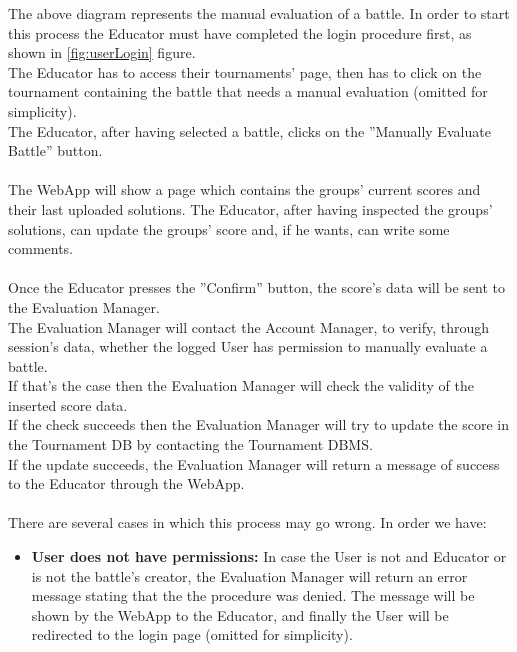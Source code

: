 \documentclass{article}
\begin{document}
{        \newpage
        The above diagram represents the manual evaluation of a battle.
        In order to start this process the Educator must have completed the login procedure first, as shown in \ref{fig:userLogin}
        figure.\\ 
        The Educator has to access their tournaments' page, then has to click on the tournament containing the 
        battle that needs a manual evaluation (omitted for simplicity).\\
        The Educator, after having selected a battle, clicks on the ”Manually Evaluate Battle” button.\\
        \\
        The WebApp will show a page which contains the groups' current scores and their last uploaded solutions.
        The Educator, after having inspected the groups' solutions, can update the groups' score and, if he wants, can write some comments.
        \\ \\
        Once the Educator presses the ”Confirm” button, the score's data will be sent to the Evaluation Manager.\\
        The Evaluation Manager will contact the Account Manager, to verify, through
        session's data, whether the logged User has permission to manually
        evaluate a battle.\\ If that's the case then the Evaluation Manager will
        check the validity of the inserted score data.
        \\
        If the check succeeds then the Evaluation Manager will try to update the score
        in the Tournament DB by contacting the Tournament DBMS.\\
        If the update succeeds, the Evaluation Manager will return a message
        of success to the Educator through the WebApp.
        \\ \\
        There are several cases in which this process may go wrong. In order we have:
        \begin{itemize}
            \item \textbf{User does not have permissions:} In case the User is not and Educator
            or is not the battle's creator, the Evaluation Manager will return an error message 
            stating that the the procedure was denied. The message will be shown 
            by the WebApp to the Educator, and finally the User will be
            redirected to the login page (omitted for simplicity).

\end{itemize}}
\end{document}
